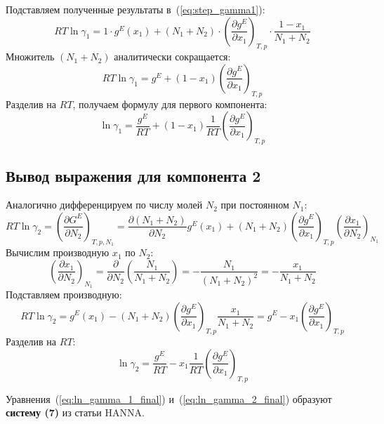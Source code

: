 \documentclass[12pt,a4paper]{article}
\begin{document}
Подставляем полученные результаты в~(\ref{eq:step_gamma1}):
\begin{equation}
    RT \ln \gamma_1 = 1 \cdot g^E(x_1) + (N_1 + N_2) \cdot \left(\frac{\partial g^E}{\partial x_1}\right)_{T,p} \cdot \frac{1 - x_1}{N_1 + N_2}
\end{equation}
Множитель $(N_1 + N_2)$ аналитически сокращается:
\begin{equation}
    RT \ln \gamma_1 = g^E + (1 - x_1)\left(\frac{\partial g^E}{\partial x_1}\right)_{T,p}
\end{equation}
Разделив на $RT$, получаем формулу для первого компонента:
\begin{equation}
    \ln \gamma_1 = \frac{g^E}{RT} + (1 - x_1) \frac{1}{RT}\left(\frac{\partial g^E}{\partial x_1}\right)_{T,p}
    \label{eq:ln_gamma_1_final}
\end{equation}

\subsection{Вывод выражения для компонента 2}
Аналогично дифференцируем по числу молей $N_2$ при постоянном $N_1$:
\begin{equation}
    RT \ln \gamma_2 = \left(\frac{\partial G^E}{\partial N_2}\right)_{T, p, N_1} = \frac{\partial (N_1 + N_2)}{\partial N_2} g^E(x_1) + (N_1 + N_2) \left(\frac{\partial g^E}{\partial x_1}\right)_{T,p} \left(\frac{\partial x_1}{\partial N_2}\right)_{N_1}
\end{equation}
Вычислим производную $x_1$ по $N_2$:
\begin{equation}
    \left(\frac{\partial x_1}{\partial N_2}\right)_{N_1} = \frac{\partial}{\partial N_2}\left(\frac{N_1}{N_1 + N_2}\right) = -\frac{N_1}{(N_1 + N_2)^2} = -\frac{x_1}{N_1 + N_2}
\end{equation}
Подставляем производную:
\begin{equation}
    RT \ln \gamma_2 = g^E(x_1) - (N_1 + N_2) \left(\frac{\partial g^E}{\partial x_1}\right)_{T,p} \frac{x_1}{N_1 + N_2} = g^E - x_1 \left(\frac{\partial g^E}{\partial x_1}\right)_{T,p}
\end{equation}
Разделив на $RT$:
\begin{equation}
    \ln \gamma_2 = \frac{g^E}{RT} - x_1 \frac{1}{RT}\left(\frac{\partial g^E}{\partial x_1}\right)_{T,p}
    \label{eq:ln_gamma_2_final}
\end{equation}

Уравнения~(\ref{eq:ln_gamma_1_final}) и~(\ref{eq:ln_gamma_2_final}) образуют \textbf{систему (7)} из статьи HANNA.
\end{document}
